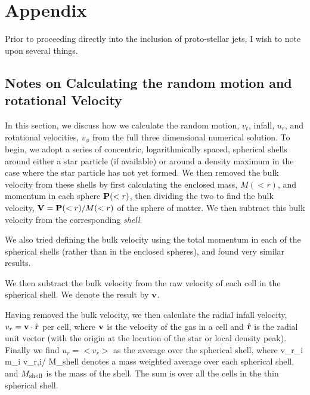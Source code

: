 \documentclass[../dissertation.tex]{subfiles}
\begin{document}
\section{Appendix} 
Prior to proceeding directly into the inclusion of proto-stellar jets, I wish to note upon several things.

\subsection{Notes on Calculating the random motion and rotational Velocity}
\label{Sec:Hydro_velocity}

In this section, we discuss how we calculate the random motion, $v_t$, infall, $u_r$, and rotational velocities, $v_{\phi}$ from the full three dimensional numerical solution.  To begin, we adopt a series of concentric, logarithmically spaced, spherical shells around either a star particle (if available) or around a density maximum in the case where the star particle has not yet formed. We then removed the bulk velocity from these shells by first calculating the enclosed mass, $M(<r)$, and momentum in each sphere ${\bf P}(<r)$, then dividing the two to find the bulk velocity, ${\bf V} = {\bf P}(<r)/M(<r)$ of the sphere of matter. We then subtract this bulk velocity from the corresponding {\em shell}. 

We also tried defining the bulk velocity using the total momentum in each of the spherical shells (rather than in the enclosed spheres), and found very similar results.

We then subtract the bulk velocity from the raw velocity of each cell in the spherical shell. We denote the result by ${\bf v}$.

Having removed the bulk velocity, we then calculate the radial infall velocity, $v_r = {\bf v}\cdot\hat{\bf r}$ per cell, where ${\bf v}$ is the velocity of the gas in a cell and $\hat{\bf r}$ is the radial unit vector (with the origin at the location of the star or local density peak).  Finally we find $u_r = <v_r>$ as the average over the spherical shell, where
%
\be 
\langle v_r\rangle \equiv \Sigma_i m_i v_{r,i}/ M_{\rm shell}
\ee
%
denotes a mass weighted average over each spherical shell, and $M_{\rm shell}$ is the mass of the shell. The sum is over all the cells in the thin spherical shell.
\end{document}
